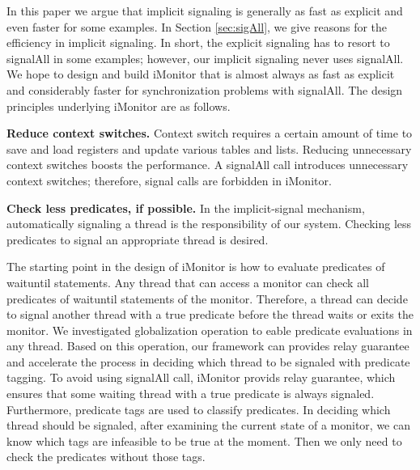 \documentclass[preprint]{sigplanconf}
\begin{document}
In this paper we argue that implicit signaling is generally as fast as explicit 
and even faster for some examples. In Section \ref{sec:sigAll}, we give reasons
for the efficiency in implicit signaling. In short, the explicit signaling has 
to resort to signalAll in some examples; however, our implicit signaling never 
uses signalAll. We hope to design and build iMonitor that is almost always as 
fast as explicit and considerably faster for synchronization problems with 
signalAll. The design principles underlying iMonitor are as follows.

\begin{description}
    \item{\bf Reduce context switches.} Context switch requires a certain 
        amount of time to save and load registers and update various tables and
        lists. Reducing unnecessary context switches boosts the performance.
        A signalAll call introduces unnecessary context switches; therefore,
        signal calls are forbidden in iMonitor. 
    \item {\bf Check less predicates, if possible.} In the implicit-signal
        mechanism, automatically signaling a thread is the responsibility of our
        system. Checking less predicates to signal an appropriate thread is
        desired. 
\end{description}



The starting point in the design of iMonitor is how to evaluate predicates of
waituntil statements. Any thread that can access a monitor can check all 
predicates of waituntil statements of the monitor. Therefore, a thread can 
decide to signal another thread with a true predicate before the thread waits
or exits the monitor. We investigated globalization operation to eable 
predicate evaluations in any thread. Based on this operation, our framework can
provides relay guarantee and accelerate the process in deciding which thread to
be signaled with predicate tagging. To avoid using signalAll call, iMonitor 
provids relay guarantee, which ensures that some waiting thread with a true 
predicate is always signaled. Furthermore, predicate tags are used to
classify predicates. In deciding which thread should be signaled, after
examining the current state of a monitor, we can know which tags are infeasible
to be true at the moment. Then we only need to check the predicates without
those tags. 
\end{document}
